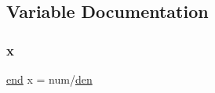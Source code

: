 \subsection{Variable Documentation}
\mbox{\label{a00020_ac98c3bb25378222646e977292011625f}} 
\subsubsection{\texorpdfstring{x}{x}}
{\footnotesize\ttfamily \hyperlink{a00608_afb358f48b1646c750fb9da6c6585be2b}{end} x = num/\hyperlink{a00605_a075a79fb221852f46c51b49f9d83204b}{den}}

